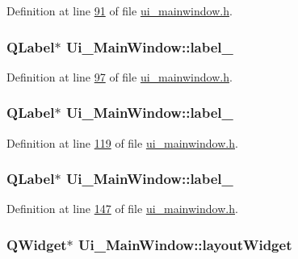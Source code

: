 Definition at line \hyperlink{a00052_source_l00091}{91} of file \hyperlink{a00052_source}{ui\+\_\+mainwindow.\+h}.

\hypertarget{a00027_a663f728e6244926a795c6e6892673b1d}{
\subsubsection[{label\+\_\+6}]{\setlength{\rightskip}{0pt plus 5cm}Q\+Label$\ast$ Ui\+\_\+\+Main\+Window\+::label\+\_}}\label{a00027_a663f728e6244926a795c6e6892673b1d}


Definition at line \hyperlink{a00052_source_l00097}{97} of file \hyperlink{a00052_source}{ui\+\_\+mainwindow.\+h}.

\hypertarget{a00027_a13936e6f18b1c90402b3c7a3c92b6cdb}{
\subsubsection[{label\+\_\+7}]{\setlength{\rightskip}{0pt plus 5cm}Q\+Label$\ast$ Ui\+\_\+\+Main\+Window\+::label\+\_}}\label{a00027_a13936e6f18b1c90402b3c7a3c92b6cdb}


Definition at line \hyperlink{a00052_source_l00119}{119} of file \hyperlink{a00052_source}{ui\+\_\+mainwindow.\+h}.

\hypertarget{a00027_af183bfbfb9f38bbdd60caf92b15e23dc}{
\subsubsection[{label\+\_\+8}]{\setlength{\rightskip}{0pt plus 5cm}Q\+Label$\ast$ Ui\+\_\+\+Main\+Window\+::label\+\_}}\label{a00027_af183bfbfb9f38bbdd60caf92b15e23dc}


Definition at line \hyperlink{a00052_source_l00147}{147} of file \hyperlink{a00052_source}{ui\+\_\+mainwindow.\+h}.

\hypertarget{a00027_ab96ab0f0578098521fa69a75aa5cdde8}{
\subsubsection[{layout\+Widget}]{\setlength{\rightskip}{0pt plus 5cm}Q\+Widget$\ast$ Ui\+\_\+\+Main\+Window\+::layout\+Widget}}\label{a00027_ab96ab0f0578098521fa69a75aa5cdde8}



